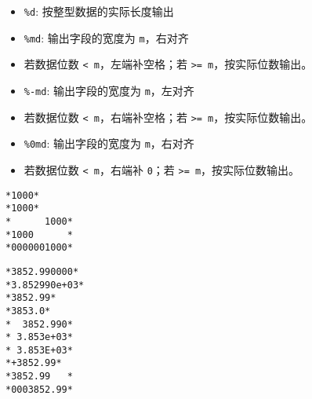 \begin{frame}[fragile]
\begin{itemize}
\item \lstinline|%d|:  按整型数据的实际长度输出\\[0.1in]
\item \lstinline|%md|:  输出字段的宽度为 \lstinline|m|，右对齐\\ 
\item[] 若数据位数 \lstinline|< m|，左端补空格；若 \lstinline|>= m|，按实际位数输出。\\[0.1in]
\item \lstinline|%-md|: 输出字段的宽度为 \lstinline|m|，左对齐\\ 
\item[] 若数据位数 \lstinline|< m|，右端补空格；若 \lstinline|>= m|，按实际位数输出。\\[0.1in]
\item \lstinline|%0md|: 输出字段的宽度为 \lstinline|m|，右对齐 \\ 
\item[] 若数据位数 \lstinline|< m|，右端补 \lstinline|0|；若 \lstinline|>= m|，按实际位数输出。
\end{itemize}
\end{frame}

% 

\begin{frame}[fragile]
\begin{lstlisting}[showspaces=true,backgroundcolor=\color{red!20}]
*1000*
*1000*
*      1000*
*1000      *
*0000001000*
\end{lstlisting}
\end{frame}


% 

\begin{frame}[fragile]
\begin{lstlisting}[showspaces=true,backgroundcolor=\color{red!20}]
*3852.990000*
*3.852990e+03*
*3852.99*
*3853.0*
*  3852.990*
* 3.853e+03*
* 3.853E+03*
*+3852.99*
*3852.99   *
*0003852.99*
\end{lstlisting}
\end{frame}

